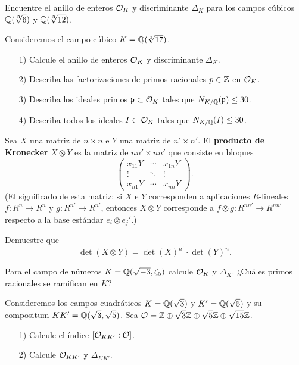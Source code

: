 \begin{ejercicio}
  Encuentre el anillo de enteros $\mathcal{O}_K$ y discriminante $\Delta_K$ para
  los campos cúbicos $\mathbb{Q} (\sqrt[3]{6})$ y $\mathbb{Q} (\sqrt[3]{12})$.
\end{ejercicio}

\begin{ejercicio}
  Consideremos el campo cúbico $K = \mathbb{Q} (\sqrt[3]{17})$.

  \begin{enumerate}
  \item[1)] Calcule el anillo de enteros $\mathcal{O}_K$ y discriminante $\Delta_K$.
  \item[2)] Describa las factorizaciones de primos racionales $p \in \mathbb{Z}$ en
    $\mathcal{O}_K$.
  \item[3)] Describa los ideales primos $\mathfrak{p} \subset \mathcal{O}_K$
    tales que $N_{K/\mathbb{Q}} (\mathfrak{p}) \le 30$.
  \item[4)] Describa todos los ideales $I \subset \mathcal{O}_K$
    tales que $N_{K/\mathbb{Q}} (I) \le 30$.
  \end{enumerate}
\end{ejercicio}

\begin{ejercicio}
  \label{ejerc:producto-de-kronecker}
  Sea $X$ una matriz de $n\times n$ e $Y$ una matriz de $n'\times n'$.
  El \textbf{producto de Kronecker} $X\otimes Y$ es la matriz de
  $nn' \times nn'$ que consiste en bloques
  \[ \begin{pmatrix}
    x_{11} Y & \cdots & x_{1n} Y \\
    \vdots & \ddots & \vdots \\
    x_{n1} Y & \cdots & x_{nn} Y
  \end{pmatrix}. \]
  (El significado de esta matriz: si $X$ e $Y$ corresponden a aplicaciones
  $R$-lineales $f\colon R^n \to R^n$ y $g\colon R^{n'}\to R^{n'}$, entonces
  $X\otimes Y$ corresponde a $f\otimes g\colon R^{nn'} \to R^{nn'}$
  respecto a la base estándar $e_i\otimes e_j'$.)

  Demuestre que
  $$\det (X\otimes Y) = \det (X)^{n'} \cdot \det (Y)^n.$$
\end{ejercicio}

\begin{ejercicio}
  Para el campo de números $K = \mathbb{Q} (\sqrt{-3},\zeta_5)$ calcule
  $\mathcal{O}_K$ y $\Delta_K$. ¿Cuáles primos racionales se ramifican en $K$?
\end{ejercicio}

\begin{ejercicio}
  Consideremos los campos cuadráticos $K = \mathbb{Q} (\sqrt{3})$ y
  $K' = \mathbb{Q} (\sqrt{5})$ y su compositum $KK' = \mathbb{Q} (\sqrt{3},\sqrt{5})$.
  Sea $\mathcal{O} = \mathbb{Z} \oplus \sqrt{3}\mathbb{Z} \oplus \sqrt{5}\mathbb{Z} \oplus \sqrt{15}\mathbb{Z}$.

  \begin{enumerate}
  \item[1)] Calcule el índice $[\mathcal{O}_{KK'} : \mathcal{O}]$.

  \item[2)] Calcule $\mathcal{O}_{KK'}$ y $\Delta_{KK'}$.
  \end{enumerate}
\end{ejercicio}

